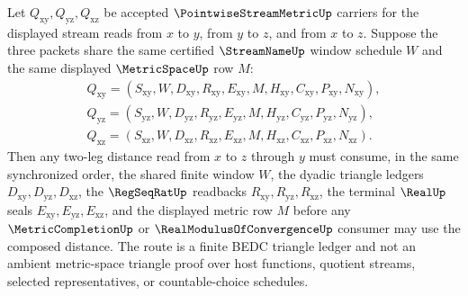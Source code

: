 \begin{theorem}
\label{thm:pointwise-stream-metric-synchronized-window-triangle-route}
Let $Q_{\mathrm{xy}},Q_{\mathrm{yz}},Q_{\mathrm{xz}}$ be accepted $\PointwiseStreamMetricUp$ carriers for the displayed stream reads from $x$ to $y$, from $y$ to $z$, and from $x$ to $z$. Suppose the three packets share the same certified $\StreamNameUp$ window schedule $W$ and the same displayed $\MetricSpaceUp$ row $M$:
$$
\begin{gathered}
Q_{\mathrm{xy}}=(S_{\mathrm{xy}},W,D_{\mathrm{xy}},R_{\mathrm{xy}},E_{\mathrm{xy}},M,H_{\mathrm{xy}},C_{\mathrm{xy}},P_{\mathrm{xy}},N_{\mathrm{xy}}),\\
Q_{\mathrm{yz}}=(S_{\mathrm{yz}},W,D_{\mathrm{yz}},R_{\mathrm{yz}},E_{\mathrm{yz}},M,H_{\mathrm{yz}},C_{\mathrm{yz}},P_{\mathrm{yz}},N_{\mathrm{yz}}),\\
Q_{\mathrm{xz}}=(S_{\mathrm{xz}},W,D_{\mathrm{xz}},R_{\mathrm{xz}},E_{\mathrm{xz}},M,H_{\mathrm{xz}},C_{\mathrm{xz}},P_{\mathrm{xz}},N_{\mathrm{xz}}).
\end{gathered}
$$
Then any two-leg distance read from $x$ to $z$ through $y$ must consume, in the same synchronized order, the shared finite window $W$, the dyadic triangle ledgers $D_{\mathrm{xy}},D_{\mathrm{yz}},D_{\mathrm{xz}}$, the $\RegSeqRatUp$ readbacks $R_{\mathrm{xy}},R_{\mathrm{yz}},R_{\mathrm{xz}}$, the terminal $\RealUp$ seals $E_{\mathrm{xy}},E_{\mathrm{yz}},E_{\mathrm{xz}}$, and the displayed metric row $M$ before any $\MetricCompletionUp$ or $\RealModulusOfConvergenceUp$ consumer may use the composed distance. The route is a finite BEDC triangle ledger and not an ambient metric-space triangle proof over host functions, quotient streams, selected representatives, or countable-choice schedules.
\end{theorem}
